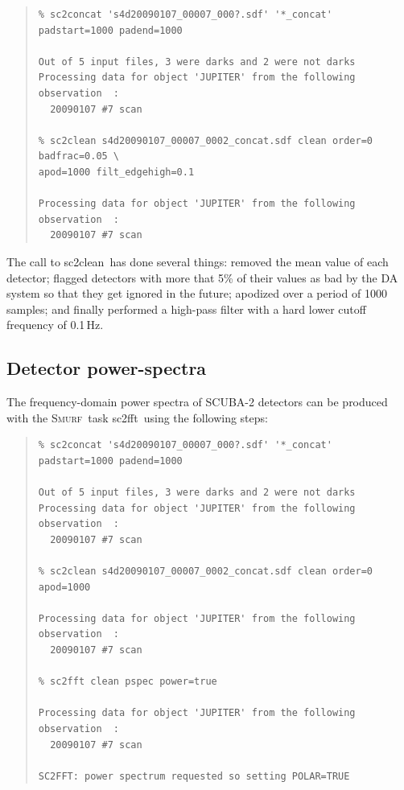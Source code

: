 \documentclass[twoside,11pt]{article}
\newenvironment{myquote}{\begin{quote}\begin{small}}{\end{small}\end{quote}}
\newcommand{\smurf}{\xref{\textsc{Smurf}}{sun258}{}}
\newcommand{\task}[1]{\textsf{#1}}
\newcommand{\fft}{\xref{\task{sc2fft}}{sun258}{SC2FFT}}
\newcommand{\clean}{\xref{\task{sc2clean}}{sun258}{SC2CLEAN}}
\newcommand{\xref}[3]{#1}
\newcommand{\xlabel}[1]{}
\renewcommand{\_}{\texttt{\symbol{95}}}
\begin{document}
\begin{myquote}
\begin{verbatim}
% sc2concat 's4d20090107_00007_000?.sdf' '*_concat' padstart=1000 padend=1000

Out of 5 input files, 3 were darks and 2 were not darks
Processing data for object 'JUPITER' from the following observation  :
  20090107 #7 scan

% sc2clean s4d20090107_00007_0002_concat.sdf clean order=0 badfrac=0.05 \
apod=1000 filt_edgehigh=0.1

Processing data for object 'JUPITER' from the following observation  :
  20090107 #7 scan
\end{verbatim}
\end{myquote}

The call to \clean\ has done several things: removed the mean value of
each detector; flagged detectors with more that 5\% of their values as
bad by the DA system so that they get ignored in the future; apodized
over a period of 1000 samples; and finally performed a high-pass
filter with a hard lower cutoff frequency of 0.1\,Hz.

\subsection{\xlabel{pspec}Detector power-spectra} 

The frequency-domain power spectra of SCUBA-2 detectors can be
produced with the \smurf\ task \fft\ using the following steps:


\begin{myquote}
\begin{verbatim}
% sc2concat 's4d20090107_00007_000?.sdf' '*_concat' padstart=1000 padend=1000

Out of 5 input files, 3 were darks and 2 were not darks
Processing data for object 'JUPITER' from the following observation  :
  20090107 #7 scan

% sc2clean s4d20090107_00007_0002_concat.sdf clean order=0 apod=1000 

Processing data for object 'JUPITER' from the following observation  :
  20090107 #7 scan

% sc2fft clean pspec power=true

Processing data for object 'JUPITER' from the following observation  :
  20090107 #7 scan

SC2FFT: power spectrum requested so setting POLAR=TRUE
\end{verbatim}
\end{myquote}
\end{document}
